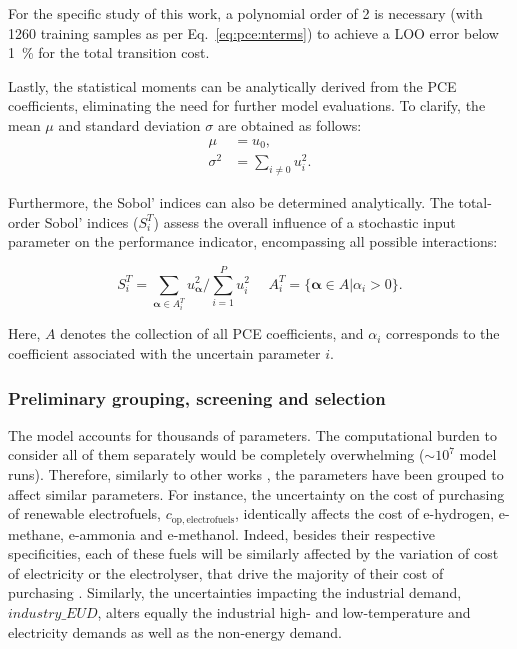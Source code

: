 \documentclass[11pt,twoside,a4paper,english]{article}
\begin{document}
For the specific study of this work, a polynomial order of 2 is necessary (with 1260 training samples as per Eq.~\ref{eq:pce:nterms}) to achieve a \gls{LOO} error below \SI{1}{\%} for the total transition cost.\par

Lastly, the statistical moments can be analytically derived from the PCE coefficients, eliminating the need for further model evaluations. To clarify, the mean $\mu$ and standard deviation $\sigma$ are obtained as follows:
\begin{align}
\mu &= u_0,\\
\sigma^2 &= \sum_{i \neq 0 } u_{i}^2 .
\label{eq:pce:statmom}
\end{align}

Furthermore, the Sobol' indices can also be determined analytically. The total-order Sobol' indices ($S_i^{T}$) assess the overall influence of a stochastic input parameter on the performance indicator, encompassing all possible interactions:

\begin{equation}
S_i^{T} = \sum_{\bm{\alpha} \in A_i^T}^{} u_{\bm{\alpha}}^2/\sum_{i=1}^P u_i^2 ~~~~~~ A_i^T = \{\bm{\alpha} \in A | \alpha_i > 0\}.
\end{equation}

Here, $A$ denotes the collection of all PCE coefficients, and $\alpha_i$ corresponds to the coefficient associated with the uncertain parameter $i$.\par

\subsubsection{Preliminary grouping, screening and selection}
\label{subsubsec:UQ:screening}
The model accounts for thousands of parameters. The computational burden to consider all of them separately would be completely overwhelming ($\sim 10^7$ model runs). Therefore, similarly to other works \cite{Moret2017,limpens2020impact}, the parameters have been grouped to affect similar parameters. For instance, the uncertainty on the cost of purchasing of renewable electrofuels, $c_{\mathrm{op,electrofuels}}$, identically affects the cost of e-hydrogen, e-methane, e-ammonia and e-methanol. Indeed, besides their respective specificities, each of these fuels will be similarly affected by the variation of cost of electricity or the electrolyser, that drive the majority of their cost of purchasing \cite{h2coalition}. Similarly, the uncertainties impacting the industrial demand, $industry\_EUD$, alters equally the industrial high- and low-temperature and electricity demands as well as the non-energy demand.
\end{document}
